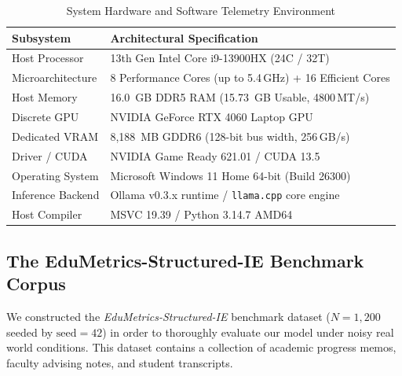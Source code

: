 \documentclass[conference]{IEEEtran}
\begin{document}
{\begin{table}[htbp]
\caption{System Hardware and Software Telemetry Environment}
\begin{center}
\begin{tabular}{ll}
\toprule
\textbf{Subsystem} & \textbf{Architectural Specification} \\
\midrule
Host Processor & 13th Gen Intel Core i9-13900HX (24C / 32T) \\
Microarchitecture & 8 Performance Cores (up to 5.4\,GHz) + 16 Efficient Cores \\
Host Memory & 16.0~GB DDR5 RAM (15.73~GB Usable, 4800\,MT/s) \\
Discrete GPU & NVIDIA GeForce RTX 4060 Laptop GPU \\
Dedicated VRAM & 8,188~MB GDDR6 (128-bit bus width, 256\,GB/s) \\
Driver / CUDA & NVIDIA Game Ready 621.01 / CUDA 13.5 \\
Operating System & Microsoft Windows 11 Home 64-bit (Build 26300) \\
Inference Backend & Ollama v0.3.x runtime / \texttt{llama.cpp} core engine \\
Host Compiler & MSVC 19.39 / Python 3.14.7 AMD64 \\
\bottomrule
\end{tabular}
\end{center}
\label{tab:hardware}
\end{table}

\subsection{The EduMetrics-Structured-IE Benchmark Corpus}
We constructed the \textit{EduMetrics-Structured-IE} benchmark dataset ($N = 1,200$ seeded by $\text{seed} = 42$) in order to thoroughly evaluate our model under noisy real world conditions. This dataset contains a collection of academic progress memos, faculty advising notes, and student transcripts.

}
\end{document}
